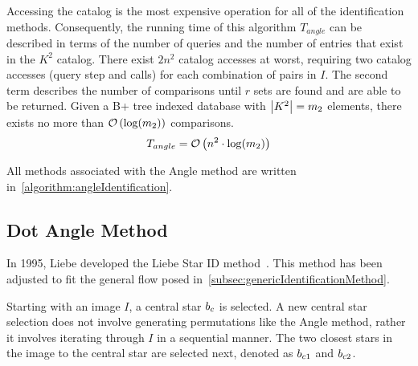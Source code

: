 Accessing the catalog is the most expensive operation for all of the identification methods.
Consequently, the running time of this algorithm $T_{angle}$ can be described in terms of the number of queries and
the number of entries that exist in the $K^2$ catalog.
There exist $2n^2$ catalog accesses at worst, requiring two catalog accesses (query step and  calls) for
each combination of pairs in $I$.
The second term describes the number of comparisons until $r$ sets are found and are able to be returned.
Given a B+ tree indexed database with $\left| K^2 \right| = m_2$ elements, there exists no more than 
$\mathcal{O} \left( \log(m_2) \right)$ comparisons.
\begin{equation}\label{eq:complexityAngle}
    T_{angle} = \bigO\left( n^2 \cdot \log(m_2) \right)
\end{equation}

All methods associated with the Angle method are written in~\autoref{algorithm:angleIdentification}.

\subsection{Dot Angle Method}\label{subsec:dotAngleMethod}
In 1995, Liebe developed the Liebe Star ID method~\cite{DotAngle,AnalysisUncompensated}.
This method has been adjusted to fit the general flow posed in~\autoref{subsec:genericIdentificationMethod}.

Starting with an image $I$, a central star $b_c$ is selected.
A new central star selection does not involve generating permutations like the Angle method, rather it involves
iterating through $I$ in a sequential manner.
The two closest stars in the image to the central star are selected next, denoted as $b_{c1}$ and $b_{c2}$.

